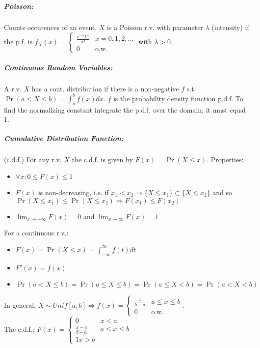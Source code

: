 \documentclass[landscape,10pt]{article}
\begin{document}
\begin{multicols}{4}
    \subparagraph*{Poisson: }
        Counts occurences of an event. \(X\) is a Poisson r.v. with parameter \(\lambda\) (intensity) if the p.f. is \(f_X(x) = \begin{cases} \frac{e^{-\lambda}\lambda^x}{x!} & x=0,1,2,\ldots \\ 0 & \text{o.w.} \end{cases}\) with \(\lambda>0\).

    \subparagraph*{Continuous Random Variables: }
        A r.v. \(X\) has a cont. distribution if there is a non-negative \(f\) s.t. \(\Pr(a \leq X \leq b) = \int_{a}^{b} f(x)dx\). \(f\) is the probability density function p.d.f. To find the normalizing constant integrate the p.d.f. over the domain, it must equal 1.

    \subparagraph*{Cumulative Distribution Function: } 
        (c.d.f.) For any r.v. \(X\) the c.d.f. is given by \(F(x) = \Pr(X \leq x)\). Properties: 
        \begin{itemize}
            \item[] \(\forall x: 0 \leq F(x) \leq 1\)
            \item[] \(F(x)\) is non-decreasing, i.e. if \(x_1 < x_2 \Rightarrow \{X \leq x_1 \} \subset \{X \leq x_2 \}\) and so \(\Pr(X \leq x_1) \leq \Pr(X \leq x_2) \Rightarrow F(x_1) \leq F(x_2)\)
            \item[] \(\lim_{x \to -\infty} F(x) = 0\) and \(\lim_{x \to \infty} F(x) = 1\)
        \end{itemize}
        \smallskip
        For a continuous r.v.:
        \begin{itemize}
            \item[] \(F(x) = \Pr(X \leq x) = \int_{-\infty}^{\infty}f(t)dt\)
            \item[] \(F'(x) = f(x)\)
            \item[] \(\Pr(a < X \leq b) = \Pr(a \leq X \leq b) = \Pr(a \leq X < b) = \Pr(a < X < b)\)
        \end{itemize}
        \smallskip
    In general, \(X \sim Unif[a,b] \Rightarrow f(x) = \begin{cases} \frac{1}{b-a} & a \leq x \leq b \\ 0 & \text{o.w.} \end{cases}\). \\
    The c.d.f.: \(F(x) = \begin{cases} 0 & x < a \\ \frac{x-a}{b-a} & a \leq x \leq b \\ 1 x > b \end{cases}\)




\end{multicols}
\end{document}
